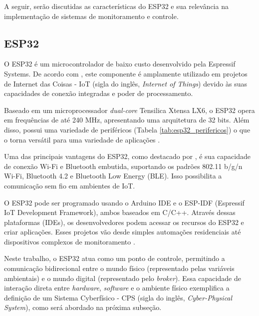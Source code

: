 A seguir, serão discutidas as características do ESP32 e sua relevância  na implementação de sistemas de monitoramento e controle.

\subsection{ESP32}

O ESP32 é um microcontrolador de baixo custo desenvolvido pela Espressif Systems. De acordo com \textcite{ESP32_usage}, este componente é amplamente utilizado em projetos de Internet das Coisas - IoT (sigla do inglês, \textit{Internet of Things}) devido às suas capacidades de conexão integradas e poder de processamento.

Baseado em um microprocessador \textit{dual-core} Tensilica Xtensa LX6, o ESP32 opera em frequências de até 240 MHz, apresentando uma arquitetura de 32 bits. Além disso, possui uma variedade de periféricos (Tabela \ref{tab:esp32_perifericos}) o que o torna versátil para uma variedade de aplicações \parencite{EspressifESP32}.

Uma das principais vantagens do ESP32, como destacado por \textcite{ESP32_usage}, é sua capacidade de conexão Wi-Fi e Bluetooth embutida, suportando os padrões 802.11 b/g/n Wi-Fi, Bluetooth 4.2 e Bluetooth Low Energy (BLE). Isso possibilita a comunicação sem fio em ambientes de IoT.

O ESP32 pode ser programado usando o Arduino IDE e o ESP-IDF (Espressif IoT Development Framework), ambos baseados em C/C++. Através dessas plataformas (IDEs), os desenvolvedores podem acessar os recursos do ESP32 e criar aplicações. Esses projetos vão desde simples automações residenciais até dispositivos complexos de monitoramento \parencite{ferrandez2018precision, junior2022data, hsu2020creative}.

Neste trabalho, o ESP32 atua como um ponto de controle, permitindo a comunicação bidirecional entre o mundo físico (representado pelas variáveis ambientais) e o mundo digital (representado pelo \textit{broker}). Essa capacidade de interação direta entre \textit{hardware}, \textit{software} e o ambiente físico exemplifica a definição de um Sistema Cyberfísico - CPS (sigla do inglês, \textit{Cyber-Physical System}), como será abordado na próxima subseção.

